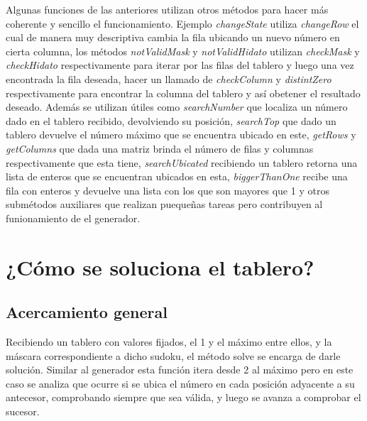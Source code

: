 \documentclass[10pt]{amsart}
\begin{document}
	 Algunas funciones de las anteriores utilizan otros m\'etodos para hacer m\'as coherente y sencillo el funcionamiento. Ejemplo \textit{changeState} utiliza \textit{changeRow} el cual de manera muy descriptiva cambia la fila ubicando un nuevo n\'umero en cierta columna, los m\'etodos \textit{notValidMask} y \textit{notValidHidato} utilizan \textit{checkMask} y \textit{checkHidato} respectivamente para iterar por las filas del tablero y luego una vez encontrada la fila deseada, hacer un llamado de \textit{checkColumn} y \textit{distintZero} respectivamente para encontrar la columna del tablero y as\'i obetener el resultado deseado.
	 Adem\'as se utilizan \'utiles como \textit{searchNumber} que localiza un n\'umero dado en el tablero recibido, devolviendo su posici\'on, \textit{searchTop} que dado un tablero devuelve el número m\'aximo que se encuentra ubicado en este, \textit{getRows} y \textit{getColumns} que dada una matriz brinda el n\'umero de filas y columnas respectivamente que esta tiene, \textit{searchUbicated} recibiendo un tablero retorna una lista de enteros que se encuentran ubicados en esta, \textit{biggerThanOne} recibe una fila con enteros y devuelve una lista con los que son mayores que 1 y otros subm\'etodos auxiliares que realizan puequeñas tareas pero contribuyen al funionamiento de el generador.
	 
    \section*{¿C\'omo se soluciona el tablero?}
	 
    \subsection*{Acercamiento general}
	Recibiendo un tablero con valores fijados, el 1 y el m\'aximo entre ellos, y la m\'ascara correspondiente a dicho sudoku, el m\'etodo solve se encarga de darle soluci\'on. Similar al generador esta funci\'on itera desde 2 al m\'aximo pero en este caso se analiza que ocurre si se ubica el n\'umero en cada posici\'on adyacente a su antecesor, comprobando siempre que sea v\'alida, y luego se avanza a comprobar el sucesor.
	 
\end{document}
